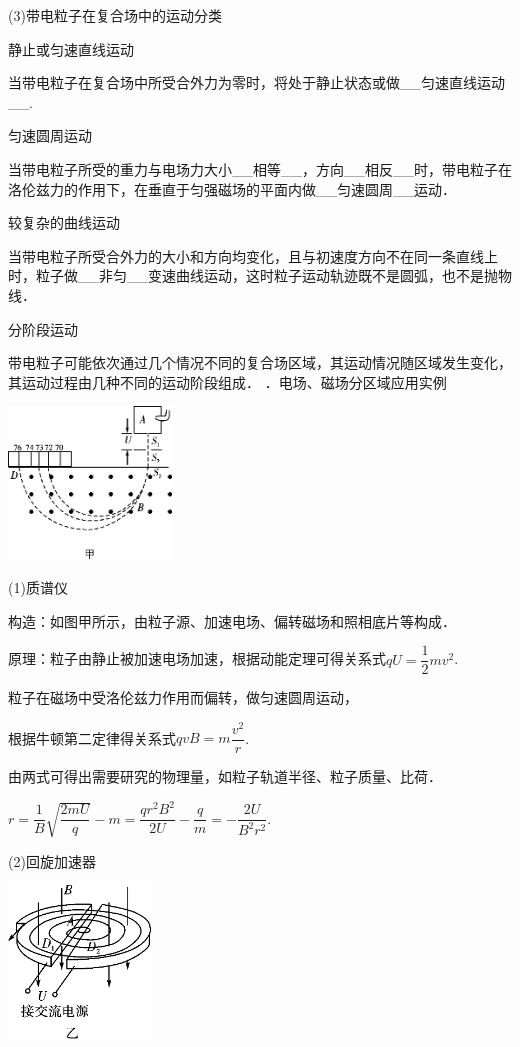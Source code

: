(3)带电粒子在复合场中的运动分类

静止或匀速直线运动

当带电粒子在复合场中所受合外力为零时，将处于静止状态或做\_\_匀速直线运动\_\_.

匀速圆周运动

当带电粒子所受的重力与电场力大小\_\_相等\_\_，方向\_\_相反\_\_时，带电粒子在洛伦兹力的作用下，在垂直于匀强磁场的平面内做\_\_匀速圆周\_\_运动．

较复杂的曲线运动

当带电粒子所受合外力的大小和方向均变化，且与初速度方向不在同一条直线上时，粒子做\_\_非匀\_\_变速曲线运动，这时粒子运动轨迹既不是圆弧，也不是抛物线．

分阶段运动

带电粒子可能依次通过几个情况不同的复合场区域，其运动情况随区域发生变化，其运动过程由几种不同的运动阶段组成．
．电场、磁场分区域应用实例

\begin{center}\includegraphics[width=1.70764in,height=1.59444in]{media/image369.png}\end{center}

(1)质谱仪

构造：如图甲所示，由粒子源、加速电场、偏转磁场和照相底片等构成．

原理：粒子由静止被加速电场加速，根据动能定理可得关系式$q U=\dfrac{1}{2} m v^{2}$.

粒子在磁场中受洛伦兹力作用而偏转，做匀速圆周运动，

根据牛顿第二定律得关系式$q v B=m \dfrac{v^{2}}{r}$.

由两式可得出需要研究的物理量，如粒子轨道半径、粒子质量、比荷．

$r=\dfrac{1}{B} \sqrt{\dfrac{2 m U}{q}}-m=\dfrac{q r^{2} B^{2}}{2 U}-\dfrac{q}{m}=-\dfrac{2 U}{B^{2} r^{2}}$.

(2)回旋加速器

\begin{center}\includegraphics[width=1.49028in,height=1.59931in]{media/image370.png}\end{center}

